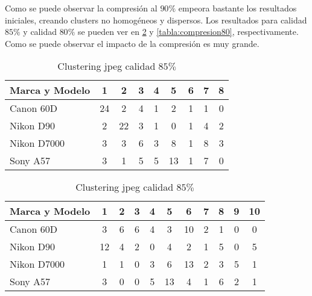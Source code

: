Como se puede observar la compresión al $90\%$ empeora bastante los resultados iniciales, creando clusters no homogéneos y dispersos. Los resultados para calidad $85\%$ y calidad $80\%$ se pueden ver en \ref{tabla:compresion85} y \ref{tabla:compresion80}, respectivamente. Como se puede observar el impacto de la compresión es muy grande.

\begin{table}[!htb]
    \centering
        \begin{tabular}{|l|c|c|c|c|c|c|c|c|}
        \hline
        \rowcolor[gray]{0.9}
        \textbf{Marca y Modelo} & 1 & 2 & 3 & 4 & 5 & 6 & 7 & 8 \\ \hline
        Canon 60D & 24 & 2 & 4 & 1 & 2 & 1 & 1 & 0 \\ \hline
        Nikon D90 & 2 & 22 & 3 & 1 & 0 & 1 & 4 & 2 \\ \hline
        Nikon D7000 & 3 & 3 & 6 & 3 & 8 & 1 & 8 & 3 \\ \hline
        Sony A57 & 3 & 1 & 5 & 5 & 13 & 1 & 7 & 0 \\ \hline
        \end{tabular}
    \caption{Clustering jpeg calidad $85\%$}
    \label{tabla:compresion85}
\end{table}

\begin{table}[!htb]
    \centering
        \begin{tabular}{|l|c|c|c|c|c|c|c|c|c|c|}
        \hline
        \rowcolor[gray]{0.9}
        \textbf{Marca y Modelo} & 1 & 2 & 3 & 4 & 5 & 6 & 7 & 8 & 9 & 10\\ \hline
        Canon 60D & 3 & 6 & 6 & 4 & 3 & 10 & 2 & 1 & 0 & 0 \\ \hline
        Nikon D90 & 12 & 4 & 2 & 0 & 4 & 2 & 1 & 5 & 0 & 5 \\ \hline
        Nikon D7000 & 1 & 1 & 0 & 3 & 6 & 13 & 2 & 3 & 5 & 1 \\ \hline
        Sony A57 & 3 & 0 & 0 & 5 & 13 & 4 & 1 & 6 & 2 & 1 \\ \hline
        \end{tabular}
    \caption{Clustering jpeg calidad $85\%$}
    \label{tabla:compresion85}
\end{table}

